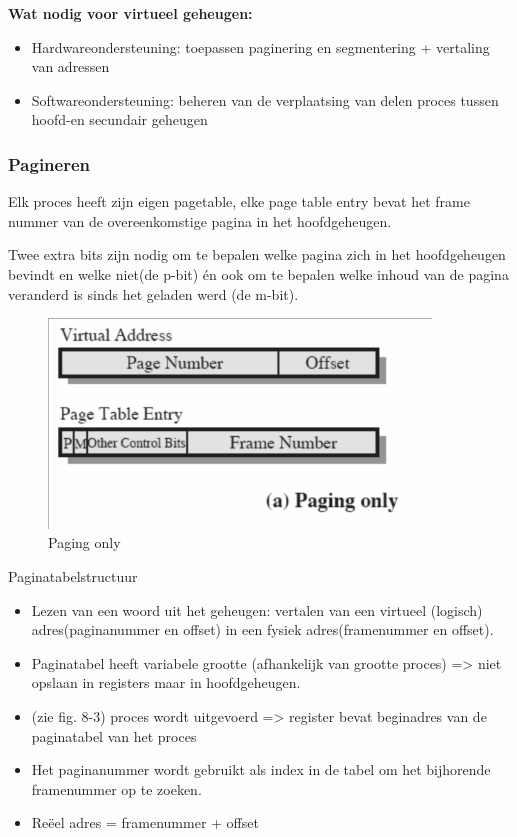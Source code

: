 \textbf{Wat nodig voor virtueel geheugen:}

\begin{itemize}
\item Hardwareondersteuning: toepassen paginering en segmentering + vertaling van adressen
\item Softwareondersteuning: beheren van de verplaatsing van delen proces tussen hoofd-en secundair geheugen
\end{itemize}

\subsubsection{Pagineren}

Elk proces heeft zijn eigen pagetable, elke page table entry bevat het frame nummer van de overeenkomstige pagina in het hoofdgeheugen.

Twee extra bits zijn nodig om te bepalen welke pagina zich in het hoofdgeheugen bevindt en welke niet(de p-bit) én ook om te bepalen welke inhoud van de pagina veranderd is sinds het geladen werd (de m-bit).

\begin{figure}[htp]
    \centering
            \includegraphics[width=4in]{img/pagineren.png}
        \caption{Paging only}
    \label{fig:Paging only}
\end{figure}

Paginatabelstructuur

\begin{itemize}
\item Lezen van een woord uit het geheugen: vertalen van een virtueel (logisch) adres(paginanummer en offset) in een fysiek adres(framenummer en offset).
\item Paginatabel heeft variabele grootte (afhankelijk van grootte proces) => niet opslaan in registers maar in hoofdgeheugen.
\item (zie fig. 8-3) proces wordt uitgevoerd => register bevat beginadres van de paginatabel van het proces
\item Het paginanummer wordt gebruikt als index in de tabel om het bijhorende framenummer op te zoeken.
\item Reëel adres = framenummer + offset
\end{itemize}

